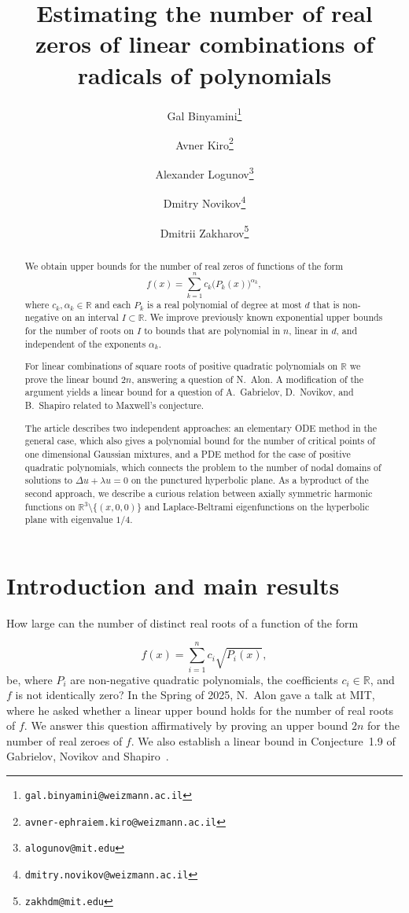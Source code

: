 \documentclass{article}
\title{Estimating the number of real zeros of linear combinations of radicals of polynomials}
\author[1]{Gal Binyamini\thanks{\texttt{gal.binyamini@weizmann.ac.il}}}
\author[1]{Avner Kiro\thanks{\texttt{avner-ephraiem.kiro@weizmann.ac.il}}}
\author[2]{Alexander Logunov\thanks{\texttt{alogunov@mit.edu}}}
\author[1]{Dmitry Novikov\thanks{\texttt{dmitry.novikov@weizmann.ac.il}}}
\author[2]{Dmitrii Zakharov\thanks{\texttt{zakhdm@mit.edu}}}
\affil[1]{Department of Mathematics, Weizmann Institute of Science, Rehovot, Israel}
\affil[2]{Department of Mathematics, Massachusetts Institute of Technology, Cambridge, MA, USA}
\begin{document}
\maketitle

\begin{abstract}
We obtain upper bounds for the number of real zeros of functions of the form
\[
f(x) = \sum_{k=1}^{n} c_k \bigl(P_k(x)\bigr)^{\alpha_k},
\]
where $c_k, \alpha_k \in \mathbb{R}$ and each $P_k$ is a real polynomial of degree at most $d$ that is non-negative on an interval $I\subset \mathbb{R}$. We improve previously known exponential upper bounds for the number of roots on $I$ to bounds that are polynomial in $n$, linear in $d$, and independent of the exponents $\alpha_k$.

For linear combinations of square roots of positive quadratic polynomials on $\mathbb{R}$ we prove the linear bound $2n$, answering a question of N.~Alon. A modification of the argument yields a linear bound for a question of A.~Gabrielov, D.~Novikov, and B.~Shapiro related to Maxwell’s conjecture. 

The article describes two independent approaches: an elementary ODE method in the general case, 
which also gives a polynomial bound for the number of critical points of one dimensional Gaussian mixtures,
and a PDE method for the case of positive quadratic polynomials, which connects the problem to the number of nodal domains of solutions to $\Delta u + \lambda u = 0$ on the punctured hyperbolic plane. As a byproduct of the second approach, we describe a curious relation between axially symmetric harmonic functions on $\mathbb{R}^3\setminus\{(x,0,0)\}$ and Laplace-Beltrami eigenfunctions on the hyperbolic plane with eigenvalue $1/4$.
\end{abstract}




\section{Introduction and main results}


How large can the number of distinct real roots of a function of the form

\begin{equation} \label{sum}
    f(x) = \sum_{i=1}^{n} c_i \sqrt{P_i(x)},
\end{equation}
 be, where \(P_i\) are non-negative quadratic polynomials, the coefficients \(c_i \in \mathbb{R}\), and \(f\) is not identically zero? 
 In the Spring of 2025, N.~Alon gave a talk at MIT, where he asked whether a linear upper bound holds for the number of real roots of $f$. We answer this question affirmatively by proving an upper bound $2n$ for the number of real zeroes of $f$. We also establish a linear bound in Conjecture~1.9 of Gabrielov, Novikov and Shapiro~\cite{GNS}.
\end{document}
